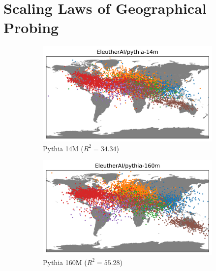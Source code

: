 \section{Scaling Laws of Geographical Probing}
\label{sec:scaling}
\begin{figure}[ht]
    \centering
    \begin{subfigure}[b]{0.48\textwidth}
         \includegraphics[trim={0 0 0 0.7cm},clip,width=\linewidth]{sources/part_1/geographical/imgs/pythia-14m.png}
         \caption{Pythia 14M ($R^2 = 34.34$)}
         \label{fig:14m_map}
         \vspace{1em}
    \end{subfigure}
    \begin{subfigure}[b]{0.48\textwidth}
         \includegraphics[trim={0 0 0 0.7cm},clip,width=\linewidth]{sources/part_1/geographical/imgs/pythia-160m.png}
         \caption{Pythia 160M ($R^2 = 55.28$)}
         \label{fig:160m_map}
        \vspace{1em}
    \end{subfigure}
    \begin{subfigure}[b]{0.48\textwidth}

\end{subfigure}
\end{figure}
